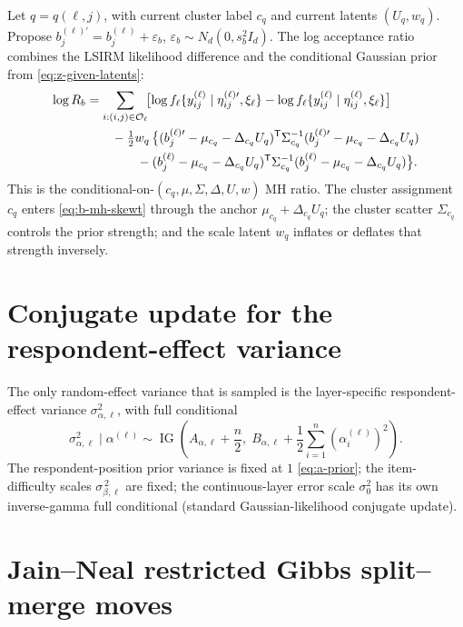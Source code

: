 \documentclass[11pt]{article}
\newcommand{\trans}{^{\mathsf T}}
\DeclareMathOperator{\IG}{IG}
\begin{document}
Let $q=q(\ell,j)$, with current cluster label $c_q$ and current latents
$(U_q,w_q)$.  Propose $b_j^{(\ell)\prime}=b_j^{(\ell)}+\varepsilon_b$,
$\varepsilon_b\sim N_d(0,s_b^2 I_d)$.  The log acceptance ratio combines
the LSIRM likelihood difference and the conditional Gaussian prior from
\eqref{eq:z-given-latents}:
\begin{align}
    \log R_b
    &=
    \sum_{i:(i,j)\in\mathcal O_\ell}
    \!\bigl[\log f_\ell\{y_{ij}^{(\ell)}\mid\eta_{ij}^{(\ell)\prime},\xi_\ell\}
        -\log f_\ell\{y_{ij}^{(\ell)}\mid\eta_{ij}^{(\ell)},\xi_\ell\}\bigr]
    \notag\\
    &\qquad
    -\tfrac{1}{2}w_q\,
    \bigl\{
    (b_j^{(\ell)\prime}-\mu_{c_q}-\Delta_{c_q}U_q)\trans
    \Sigma_{c_q}^{-1}
    (b_j^{(\ell)\prime}-\mu_{c_q}-\Delta_{c_q}U_q)
    \notag\\
    &\hspace{4em}
    -(b_j^{(\ell)}-\mu_{c_q}-\Delta_{c_q}U_q)\trans
    \Sigma_{c_q}^{-1}
    (b_j^{(\ell)}-\mu_{c_q}-\Delta_{c_q}U_q)
    \bigr\}.
    \label{eq:b-mh-skewt}
\end{align}
This is the conditional-on-$(c_q,\mu,\Sigma,\Delta,U,w)$ MH ratio.  The
cluster assignment $c_q$ enters \eqref{eq:b-mh-skewt} through the
anchor $\mu_{c_q}+\Delta_{c_q}U_q$; the cluster scatter $\Sigma_{c_q}$
controls the prior strength; and the scale latent $w_q$ inflates or
deflates that strength inversely.

\section{Conjugate update for the respondent-effect variance}

The only random-effect variance that is sampled is the layer-specific
respondent-effect variance $\sigma_{\alpha,\ell}^2$, with full conditional
\begin{equation}
    \sigma_{\alpha,\ell}^2\mid\alpha^{(\ell)}
    \sim
    \IG\!\left(
    A_{\alpha,\ell}+\frac{n}{2},\;
    B_{\alpha,\ell}+\frac{1}{2}\sum_{i=1}^n(\alpha_i^{(\ell)})^2
    \right).
    \label{eq:sigma-alpha-update}
\end{equation}
The respondent-position prior variance is fixed at $1$ \eqref{eq:a-prior};
the item-difficulty scales $\sigma_{\beta,\ell}^{\,2}$ are fixed; the
continuous-layer error scale $\sigma_0^2$ has its own inverse-gamma full
conditional (standard Gaussian-likelihood conjugate update).

\section{Jain--Neal restricted Gibbs split--merge moves}
\label{sec:split-merge}
\end{document}
